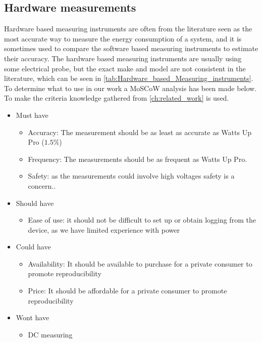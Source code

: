 \subsection{Hardware measurements} \label{sec:clampIntro}
Hardware based measuring instruments are often from the literature seen as the most accurate way to measure the energy consumption of a system, and it is sometimes used to compare the software based measuring instruments to estimate their accuracy\cite{fahad2019comparative}. The hardware based measuring instruments are usually using some electrical probe, but the exact make and model are not consistent in the literature, which can be seen in \cref{tab:Hardware_based_Measuring_instruments}.
To determine what to use in our work a MoSCoW analysis has been made below. To make the criteria knowledge gathered from \cref{ch:related_work} is used.

\begin{itemize}
    \item Must have
    \begin{itemize}
        \item Accuracy: The measurement should be as least as accurate as Watts Up Pro ($1.5\%$)
        \item Frequency: The measurements should be as frequent as Watts Up Pro.
        \item Safety: as the measurements could involve high voltages safety is a concern.\cite{sik}.
    \end{itemize}
    \item Should have
    \begin{itemize}
        \item Ease of use: it should not be difficult to set up or obtain logging from the device, as we have limited experience with power
    \end{itemize}
    \item Could have
    \begin{itemize}
        \item Availability: It should be available to purchase for a private consumer to promote reproducibility
        \item Price: It should be affordable for a private consumer to promote reproducibility 
    \end{itemize}
    \item Wont have
    \begin{itemize}
        \item DC measuring
    \end{itemize}
\end{itemize}

